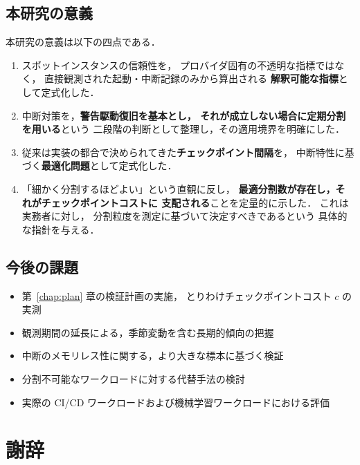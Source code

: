 \documentclass[11pt,a4paper]{ltjsreport}
\begin{document}
\section{本研究の意義}

本研究の意義は以下の四点である．

\begin{enumerate}
  \item スポットインスタンスの信頼性を，
        プロバイダ固有の不透明な指標ではなく，
        直接観測された起動・中断記録のみから算出される
        \textbf{解釈可能な指標}として定式化した．
  \item 中断対策を，\textbf{警告駆動復旧を基本とし，
        それが成立しない場合に定期分割を用いる}という
        二段階の判断として整理し，その適用境界を明確にした．
  \item 従来は実装の都合で決められてきた\textbf{チェックポイント間隔}を，
        中断特性に基づく\textbf{最適化問題}として定式化した．
  \item 「細かく分割するほどよい」という直観に反し，
        \textbf{最適分割数が存在し，それがチェックポイントコストに
        支配される}ことを定量的に示した．
        これは実務者に対し，
        分割粒度を測定に基づいて決定すべきであるという
        具体的な指針を与える．
\end{enumerate}

\section{今後の課題}

\begin{itemize}
  \item 第~\ref{chap:plan} 章の検証計画の実施，
        とりわけチェックポイントコスト $c$ の実測
  \item 観測期間の延長による，季節変動を含む長期的傾向の把握
  \item 中断のメモリレス性に関する，より大きな標本に基づく検証
  \item 分割不可能なワークロードに対する代替手法の検討
  \item 実際の CI/CD ワークロードおよび機械学習ワークロードにおける評価
\end{itemize}

\chapter*{謝辞}
\end{document}
